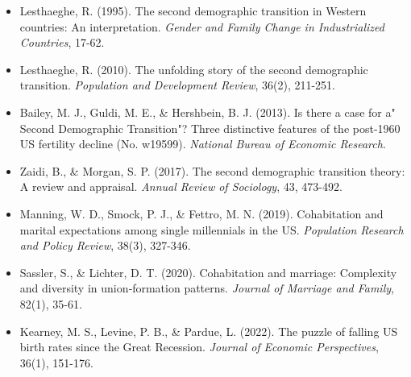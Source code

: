 \documentclass{article}
\begin{document}
\begin{itemize}
\begin{itemize}
\item Lesthaeghe, R. (1995). The second demographic transition in Western countries: An interpretation. \textit{Gender and Family Change in Industrialized Countries}, 17-62.
\item Lesthaeghe, R. (2010). The unfolding story of the second demographic transition. \textit{Population and Development Review}, 36(2), 211-251.
\item Bailey, M. J., Guldi, M. E., \& Hershbein, B. J. (2013). Is there a case for a" Second Demographic Transition"? Three distinctive features of the post-1960 US fertility decline (No. w19599).  \textit{National Bureau of Economic Research}.
\item Zaidi, B., \& Morgan, S. P. (2017). The second demographic transition theory: A review and appraisal. \textit{Annual Review of Sociology}, 43, 473-492.
\item Manning, W. D., Smock, P. J., \& Fettro, M. N. (2019). Cohabitation and marital expectations among single millennials in the US. \textit{Population Research and Policy Review}, 38(3), 327-346.
\item Sassler, S., \& Lichter, D. T. (2020). Cohabitation and marriage: Complexity and diversity in union‐formation patterns. \textit{Journal of Marriage and Family}, 82(1), 35-61.
\item Kearney, M. S., Levine, P. B., \& Pardue, L. (2022). The puzzle of falling US birth rates since the Great Recession. \textit{Journal of Economic Perspectives}, 36(1), 151-176.
\end{itemize}
\end{itemize}
\end{document}
